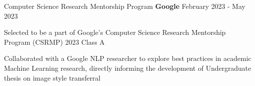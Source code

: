 
\begin{cventries}

  \cventry
    {Computer Science Research Mentorship Program}
    {\textbf{Google}}
    {}
    {February 2023 - May 2023}
    {
      \begin{cvitems}
        \item{Selected to be a part of Google’s Computer Science Research Mentorship Program (CSRMP) 2023 Class A}
        \item{Collaborated with a Google NLP researcher to explore best practices in academic Machine Learning research, directly informing the development of Undergraduate thesis on image style transferral}
      \end{cvitems}
    }

\end{cventries}
